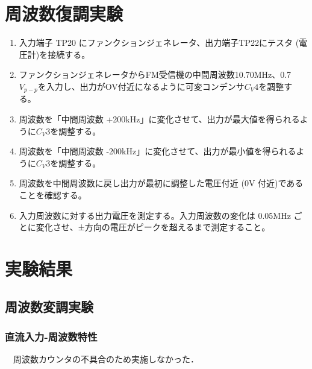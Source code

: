 \section{周波数復調実験}
\begin{enumerate}
  \item 入力端子 TP20 にファンクションジェネレータ、出力端子TP22にテスタ (電圧計)を接続する。\\
  \item ファンクションジェネレータからFM受信機の中間周波数10.70MHz、0.7$V_{p-p}$を入力し、出力がOV付近になるように可変コンデンサ$C_V4$を調整する。\\
  \item 周波数を「中間周波数 +200kHz」に変化させて、出力が最大値を得られるように$C_V3$を調整する。\\
  \item 周波数を「中間周波数 -200kHz」に変化させて、出力が最小値を得られるように$C_V3$を調整する。\\
  \item 周波数を中間周波数に戻し出力が最初に調整した電圧付近 (0V 付近)であることを確認する。\\
  \item 入力周波数に対する出力電圧を測定する。入力周波数の変化は 0.05MHz ごとに変化させ、±方向の電圧がピークを超えるまで測定すること。
\end{enumerate}

\newpage
\section{実験結果}
\subsection{周波数変調実験}
\subsubsection{直流入力-周波数特性}
　周波数カウンタの不具合のため実施しなかった．\\

